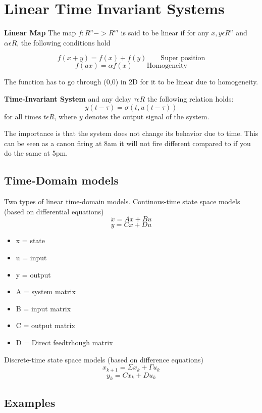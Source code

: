 \section{Linear Time Invariant Systems}

\textbf{Linear Map} \newline
The map $f: R^n -> R^m$ is said to be linear if for any $x,y \epsilon R^n$ and
$\alpha \epsilon R$, the following conditions hold

$$f(x+y) = f(x) + f(y)  \qquad \text{Super position}$$
$$f(ax) = \alpha f(x) \qquad \text{Homogeneity}$$

The function has to go through (0,0) in 2D for it to be linear due to homogeneity.


\textbf{Time-Invariant System} \newline
and any delay $\tau \epsilon R$ the following relation holds:
$$ y(t-\tau)= \sigma(t,u(t-\tau))$$
for all times $t\epsilon R$, where $y$ denotes the output signal of the system.

The importance is that the system does not change its behavior due to time.
This can be seen as a canon firing at 8am it will not fire different
compared to if you do the same at 5pm.

\subsection{Time-Domain models}

Two types of linear time-domain models. \newline
Continous-time state space models
(based on differential equations)
$$\dot{x} = Ax+Bu$$
$$y=Cx+Du$$
\begin{itemize}
	\item x = state
	\item u = input
	\item y = output
	\item A = system matrix
	\item B = input matrix
	\item C = output matrix
	\item D = Direct feedtrhough matrix
\end{itemize}
Discrete-time state space models (based on difference equations)
$$x_{k+1} = \Sigma x_k + \Gamma u_k$$
$$y_k = Cx_k + Du_k$$


\subsection{Examples}

